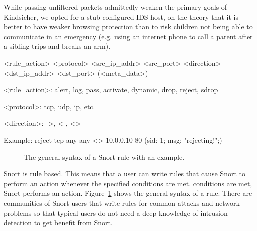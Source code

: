 While passing unfiltered packets admittedly weaken the primary goals of
Kindsicher, we opted for a stub-configured IDS host, on the theory that it is
better to have weaker browsing protection than to risk children not being able
to communicate in an emergency (e.g. using an internet phone to call a parent
after a sibling trips and breaks an arm).




\begin{verbbox}
<rule_action> <protocol>
    <src_ip_addr> <src_port>
    <direction>
    <dst_ip_addr> <dst_port>
    (<meta_data>)


<rule_action>: alert, log, pass, activate,
    dynamic, drop, reject, sdrop

<protocol>: tcp, udp, ip, etc.

<direction>: ->, <-, <>

Example:
reject tcp
    any any
    <>
    10.0.0.10 80
    (sid: 1; msg: "rejecting!";)

\end{verbbox}

\begin{figure}[!t]
    \centering
    \theverbbox
    \caption{The general syntax of a Snort rule with an example.}
    \label{fig:rule_syntax}
\end{figure}

Snort is rule based. 
%
This means that a user can write rules that cause Snort to perform an action
whenever the specified conditions are met.  conditions are met, Snort performs
an action.
%
Figure~\ref{fig:rule_syntax} shows the general syntax of a rule. There are
communities of Snort users that write rules for common attacks and network
problems so that typical users do not need a deep knowledge of intrusion
detection to get benefit from Snort.

